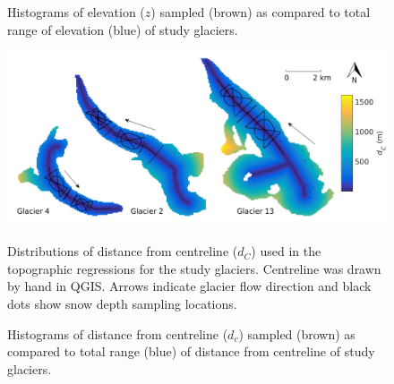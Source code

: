 \documentclass[12pt]{article}
\newcommand{\topomap}{Arrows indicate glacier flow direction and black dots show snow depth sampling locations. }
\begin{document}
\begin{figure}[H]
	\caption{Histograms of elevation ($z$) sampled (brown) as compared to total range of elevation (blue) of study glaciers.}
	\label{sampledRange:elev}
\end{figure}

\begin{figure}[H]
	\centering
	\includegraphics[width=\textwidth]{Map_centreD.png}\\
	\caption{Distributions of distance from centreline ($d_C$) used in the topographic regressions for the study glaciers. Centreline was drawn by hand in QGIS. \topomap}
	\label{map:centreD}
\end{figure}

\begin{figure}[H]
	\caption{Histograms of distance from centreline ($d_c$) sampled (brown) as compared to total range (blue) of distance from centreline of study glaciers.}
	\label{sampledRange:centreD}
\end{figure}
\end{document}

